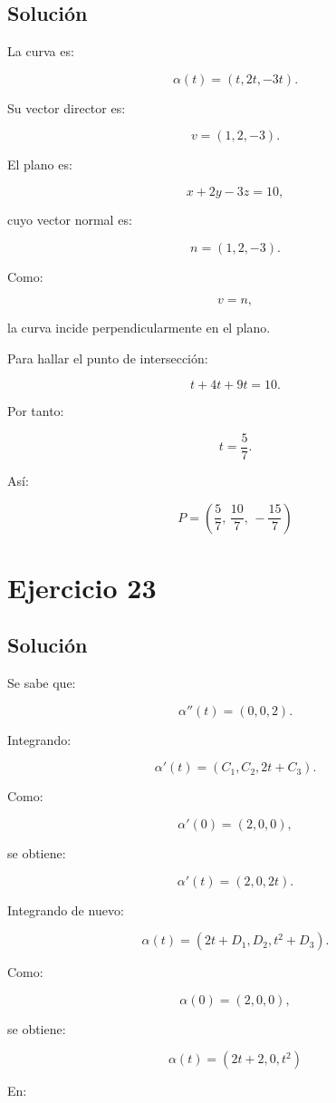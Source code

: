 \documentclass[11pt,a4paper]{article}
\begin{document}
\subsection{Solución}

La curva es:

\[
\alpha(t)
=
(t,2t,-3t).
\]

Su vector director es:

\[
v=(1,2,-3).
\]

El plano es:

\[
x+2y-3z=10,
\]

cuyo vector normal es:

\[
n=(1,2,-3).
\]

Como:

\[
v=n,
\]

la curva incide perpendicularmente en el plano.

Para hallar el punto de intersección:

\[
t+4t+9t=10.
\]

Por tanto:

\[
t=\frac57.
\]

Así:

\[
\boxed{
P=
\left(
\frac57,\,
\frac{10}{7},\,
-\frac{15}{7}
\right)
}
\]

\section{Ejercicio 23}
\subsection{Solución}

Se sabe que:

\[
\alpha''(t)
=
(0,0,2).
\]

Integrando:

\[
\alpha'(t)
=
(C_1,C_2,2t+C_3).
\]

Como:

\[
\alpha'(0)
=
(2,0,0),
\]

se obtiene:

\[
\alpha'(t)
=
(2,0,2t).
\]

Integrando de nuevo:

\[
\alpha(t)
=
(2t+D_1,D_2,t^2+D_3).
\]

Como:

\[
\alpha(0)
=
(2,0,0),
\]

se obtiene:

\[
\boxed{
\alpha(t)
=
(2t+2,0,t^2)
}
\]

En:
\end{document}

